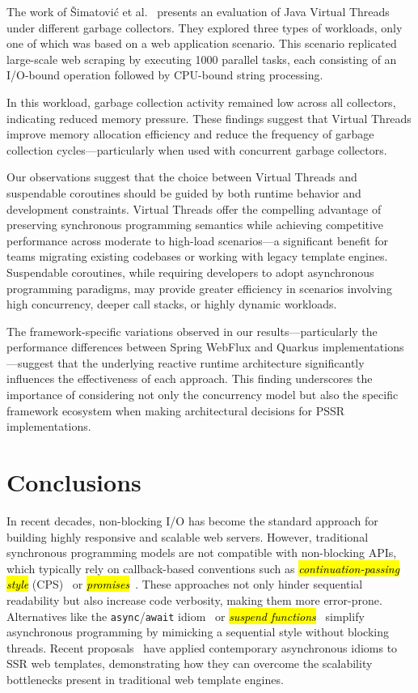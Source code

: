 \documentclass[software,article,accept,pdftex,moreauthors]{Definitions/mdpi}
\begin{document}
The work of Šimatović et al.~\cite{vsimatovic2025evaluating} presents an
evaluation of Java Virtual Threads under different garbage collectors. They
explored three types of workloads, only one of which was based on a web
application scenario. This scenario replicated large-scale web scraping by
executing 1000 parallel tasks, each consisting of an I/O-bound operation
followed by CPU-bound string processing.

In this workload, garbage collection activity remained low across all
collectors, indicating reduced memory pressure. These findings suggest that
Virtual Threads improve memory allocation efficiency and reduce the frequency
of garbage collection cycles---particularly when used with concurrent garbage
collectors.

Our observations suggest that the choice between Virtual Threads and
suspendable coroutines should be guided by both runtime behavior and
development constraints. Virtual Threads offer the compelling advantage of
preserving synchronous programming semantics while achieving competitive
performance across moderate to high-load scenarios---a significant benefit for
teams migrating existing codebases or working with legacy template engines.
Suspendable coroutines, while requiring developers to adopt asynchronous
programming paradigms, may provide greater efficiency in scenarios involving
high concurrency, deeper call stacks, or highly dynamic workloads.

The framework-specific variations observed in our results---particularly the
performance differences between Spring WebFlux and Quarkus
implementations---suggest that the underlying reactive runtime architecture
significantly influences the effectiveness of each approach. This finding
underscores the importance of considering not only the concurrency model but
also the specific framework ecosystem when making architectural decisions for
PSSR implementations.

\section{Conclusions}\label{s7}

In recent decades, non-blocking I/O has become the standard approach for building
highly responsive and scalable web servers. However, traditional synchronous
programming models are not compatible with non-blocking APIs, which typically
rely on callback-based conventions such as
\textit{\hl{continuation-passing style}} (CPS)~\cite{scheme} or
\textit{\hl{promises}}~\cite{promise}. These approaches not only hinder
sequential readability but also increase code verbosity, making them more
error-prone.
Alternatives like the \texttt{async}/\texttt{await} idiom~\cite{async_await}
or \textit{\hl{suspend functions}}~\cite{elizarov2021coroutines} simplify
asynchronous programming by mimicking a sequential style without blocking
threads.
Recent proposals~\cite{carvalho2023async,wise2024pssr} have applied contemporary
asynchronous idioms to SSR web templates, demonstrating how they can overcome
the scalability bottlenecks present in traditional web template engines.
\end{document}
